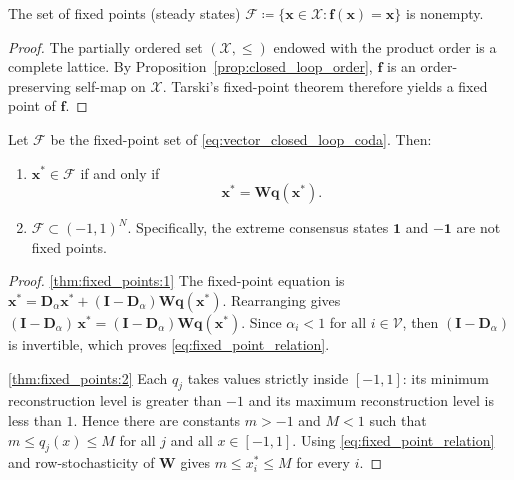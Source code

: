 \documentclass[journal,twoside,web]{ieeecolor}
\begin{document}
\begin{corollary}
    \label{cor:fixed_point_existence}
    The set of fixed points (steady states) $\mathcal{F}\coloneqq \{\bm{x}\in\mathcal{X}:\bm{f}(\bm{x})=\bm{x}\}$ is nonempty.
\end{corollary}

\begin{proof}
    The partially ordered set $(\mathcal{X},\le)$ endowed with the product order is a complete lattice. By Proposition~\ref{prop:closed_loop_order}, $\bm{f}$ is an order-preserving self-map on $\mathcal{X}$. Tarski's fixed-point theorem \cite{tarski1955lattice} therefore yields a fixed point of $\bm{f}$.
\end{proof}

\begin{theorem}
    \label{thm:fixed_points}
    Let $\mathcal F$ be the fixed-point set of \eqref{eq:vector_closed_loop_coda}. Then:
    \begin{enumerate}[wide, label=\roman*), ref=(\roman*)]
        \item $\bm x^*\in\mathcal F$ if and only if\label{thm:fixed_points:1}
              \begin{equation}\label{eq:fixed_point_relation}
                  \bm x^*=\bm W\bm q(\bm x^*).
              \end{equation}
        \item $\mathcal F\subset(-1,1)^N$. Specifically, the extreme consensus states $\bm 1$ and $-\bm 1$ are not fixed points.\label{thm:fixed_points:2}
    \end{enumerate}
\end{theorem}

\begin{proof}
    \ref{thm:fixed_points:1} The fixed-point equation is $\bm{x}^*=\bm{D}_{\alpha}\bm{x}^* +(\bm{I}-\bm{D}_{\alpha})\bm{W}\bm{q}(\bm {x}^*)$.
    Rearranging gives
    $(\bm I-\bm D_\alpha)\,\bm x^*
        =(\bm I-\bm D_\alpha)\bm W\bm q(\bm x^*)$. Since $\alpha_i<1$ for all $i \in \mathcal{V}$, then $(\bm I-\bm D_\alpha)$ is invertible, which proves \eqref{eq:fixed_point_relation}.

    \ref{thm:fixed_points:2} Each $q_j$ takes values strictly inside $[-1,1]$: its minimum reconstruction level is greater than $-1$ and its maximum reconstruction level is less than $1$. Hence there are constants $m>-1$ and $M<1$ such that $m\le q_j(x)\le M$ for all $j$ and all $x\in[-1,1]$. Using \eqref{eq:fixed_point_relation} and row-stochasticity of $\bm W$ gives $m\le x_i^*\le M$ for every $i$.
\end{proof}
\end{document}
